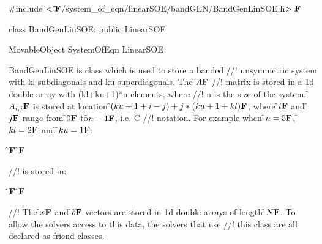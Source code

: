 
\indent \#include \f$<\tilde{ }{\bf F}$/system\_of\_eqn/linearSOE/bandGEN/BandGenLinSOE.h\f$>{\bf F}$

\indent class BandGenLinSOE: public LinearSOE

\indent MovableObject
\indent\indent SystemOfEqn
\indent\indent\indent LinearSOE
\indent\indent\indent{}

\indent BandGenLinSOE is class which is used to store a banded
//! unsymmetric system with kl subdiagonals and ku superdiagonals. The \f$A{\bf F}$
//! matrix is stored in a 1d double array with (kl+ku+1)*n elements, where
//! n is the size of the system. \f$A_{i,j}{\bf F}$ is stored at location
\f$(ku+1+i-j) + j*(ku+1+kl){\bf F}$, where \f$i{\bf F}$ and \f$j{\bf F}$ range from \f$0{\bf F}$ to\f$n-1{\bf F}$, i.e. C
//! notation. For example when \f$n=5{\bf F}$, \f$kl = 2{\bf F}$ and \f$ku=1{\bf F}$: 

\f${\bf F}$
\f${\bf F}$

//! is stored in:

\f${\bf F}$
\f${\bf F}$

//! The \f$x{\bf F}$ and \f$b{\bf F}$ vectors are stored in 1d double arrays of length
\f$N{\bf F}$. To allow the solvers access to this data, the solvers that use
//! this class are all declared as friend classes. 


